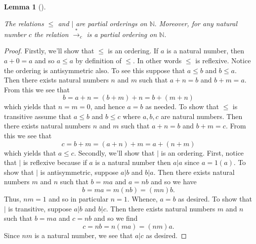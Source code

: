 \documentclass[
  twoside,
  12pt,
  letterpaper]{article}
\theoremstyle{definition}
\theoremstyle{plain}
\newtheorem{lemma}{Lemma}[section]
\theoremstyle{plain}
\theoremstyle{definition}
\theoremstyle{definition}
\theoremstyle{remark}
\begin{document}
\begin{lemma}[]\protect\hypertarget{lem-partial-orderings-on-natural-numbers}{}\label{lem-partial-orderings-on-natural-numbers}

The relations \(\leq\) and \(\vert\) are partial orderings on
\(\mathbb{N}.\) Moreover, for any natural number \(c\) the relation
\(\overset{*}{\longrightarrow}_c\) is a partial ordering on
\(\mathbb{N}.\)

\end{lemma}

\begin{proof}

Firstly, we'll show that \(\leq\) is an ordering. If \(a\) is a natural
number, then \(a+0 = a\) and so \(a\leq a\) by definition of \(\leq\).
In other words \(\leq\) is reflexive. Notice the ordering is
antisymmetric also. To see this suppose that \(a\leq b\) and
\(b\leq a\). Then there exists natural numbers \(n\) and \(m\) such that
\(a+n = b\) and \(b+m = a\). From this we see that \begin{equation}
\label{additive-antisymmetric}
b=a+n=(b+m)+n=b+(m+n)
\end{equation} which yields that \(n=m=0\), and hence \(a=b\) as needed.
To show that \(\leq\) is transitive assume that \(a\leq b\) and
\(b\leq c\) where \(a,b,c\) are natural numbers. Then there exists
natural numbers \(n\) and \(m\) such that \(a+n = b\) and \(b+m = c\).
From this we see that \begin{equation}
\label{additive-transitive}
c=b+m=(a+n)+m=a+(n+m)
\end{equation} which yields that \(a\leq c\). Secondly, we'll show that
\(\vert\) is an ordering. First, notice that \(|\) is reflexive because
if \(a\) is a natural number then \(a|a\) since \(a=1(a)\). To show that
\(|\) is antisymmetric, suppose \(a|b\) and \(b|a\). Then there exists
natural numbers \(m\) and \(n\) such that \(b=m a\) and \(a=n b\) and so
we have \begin{equation}
\label{multiplicative-antisymmetric}
b=ma=m(nb)=(mn)b.
\end{equation} Thus, \(nm=1\) and so in particular \(n=1.\) Whence,
\(a=b\) as desired. To show that \(|\) is transitive, suppose \(a|b\)
and \(b|c.\) Then there exists natural numbers \(m\) and \(n\) such that
\(b=m a\) and \(c=nb\) and so we find \begin{equation}
\label{multiplicative-transitive}
c=nb=n(ma)=(nm)a.
\end{equation} Since \(nm\) is a natural number, we see that \(a|c\) as
desired.

\end{proof}
\end{document}
